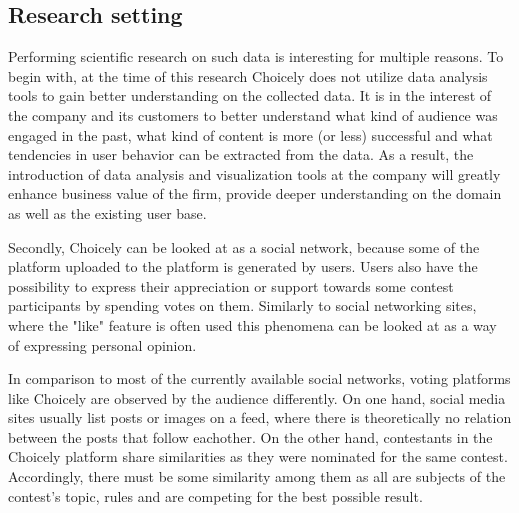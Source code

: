 
\subsection{Research setting}
    Performing scientific research on such data is interesting for multiple reasons. To begin with, at the time of this research Choicely does not utilize data analysis tools to gain better understanding on the collected data. It is in the interest of the company and its customers to better understand what kind of audience was engaged in the past, what kind of content is more (or less) successful and what tendencies in user behavior can be extracted from the data. As a result, the introduction of data analysis and visualization tools at the company will greatly enhance business value of the firm, provide deeper understanding on the domain as well as the existing user base.   
    
    Secondly, Choicely can be looked at as a social network, because some of the platform uploaded to the platform is generated by users. Users also have the possibility to express their appreciation or support towards some contest participants by spending votes on them. Similarly to social networking sites, where the "like" feature is often used \cite{jang2015noreciprocity, bakhshi2014faces} this phenomena can be looked at as a way of expressing personal opinion. 
    
    In comparison to most of the currently available social networks, voting platforms like Choicely are observed by the audience differently. On one hand, social media sites usually list posts or images on a feed, where there is theoretically no relation between the posts that follow eachother. On the other hand, contestants in the Choicely platform share similarities as they were nominated for the same contest. Accordingly, there must be some similarity among them as all are subjects of the contest's topic, rules and are competing for the best possible result. 

